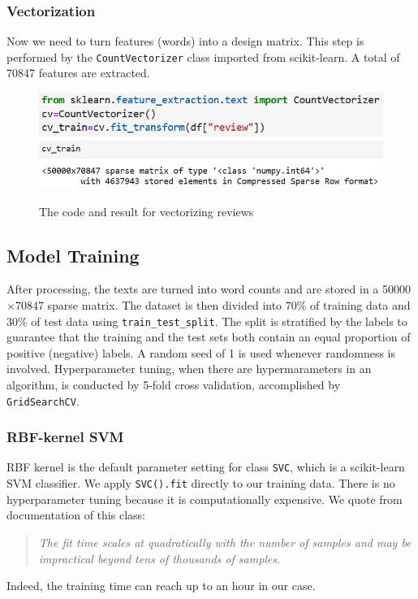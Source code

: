 \documentclass[10pt,twocolumn,letterpaper]{article}
\begin{document}
	\subsubsection{Vectorization}
	Now we need to turn features (words) into a design matrix. This step is performed by the \texttt{CountVectorizer} class imported from scikit-learn. A total of 70847 features are extracted.
	\begin{figure}[H]
		\includegraphics[width = \columnwidth]{vectorization}
		\includegraphics[width = \columnwidth]{vec_result}
		\caption{The code and result for vectorizing reviews}
	\end{figure}
	
	\subsection{Model Training}
	After processing, the texts are turned into word counts and are stored in a 50000$\times$70847 sparse matrix. The dataset is then divided into 70\% of training data and 30\% of test data using \texttt{train\_test\_split}. The split is stratified by the labels to guarantee that the training and the test sets both contain an equal proportion of positive (negative) labels. A random seed of 1 is used whenever randomness is involved. Hyperparameter tuning, when there are hypermarameters in an algorithm, is conducted by 5-fold cross validation, accomplished by \texttt{GridSearchCV}. 
	\subsubsection{RBF-kernel SVM}
	RBF kernel is the default parameter setting for class \texttt{SVC}, which is a scikit-learn SVM classifier. We apply \texttt{SVC().fit} directly to our training data. There is no hyperparameter tuning because it is computationally expensive. We quote from documentation of this class:
	\begin{quote}
		\itshape
		The fit time scales at quadratically with the number of samples and may be impractical beyond tens of thousands of samples.
	\end{quote} 
	Indeed, the training time can reach up to an hour in our case. 
\end{document}
